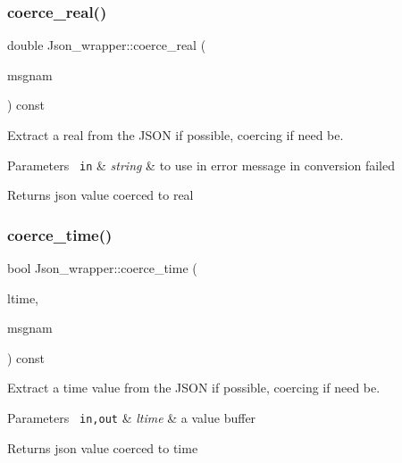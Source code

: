 \subsubsection{\texorpdfstring{coerce\+\_\+real()}{coerce\_real()}}
{\footnotesize\ttfamily double Json\+\_\+wrapper\+::coerce\+\_\+real (\begin{DoxyParamCaption}\item[{const char $\ast$}]{msgnam }\end{DoxyParamCaption}) const}

Extract a real from the J\+S\+ON if possible, coercing if need be.


\begin{DoxyParams}[1]{Parameters}
\mbox{\texttt{ in}}  & {\em string} & to use in error message in conversion failed \\
\hline
\end{DoxyParams}
\begin{DoxyReturn}{Returns}
json value coerced to real 
\end{DoxyReturn}
\mbox{\label{classJson__wrapper_a31da2ba0c06635c562a785596d868ee0}} 
\subsubsection{\texorpdfstring{coerce\+\_\+time()}{coerce\_time()}}
{\footnotesize\ttfamily bool Json\+\_\+wrapper\+::coerce\+\_\+time (\begin{DoxyParamCaption}\item[{M\+Y\+S\+Q\+L\+\_\+\+T\+I\+ME $\ast$}]{ltime,  }\item[{const char $\ast$}]{msgnam }\end{DoxyParamCaption}) const}

Extract a time value from the J\+S\+ON if possible, coercing if need be.


\begin{DoxyParams}[1]{Parameters}
\mbox{\texttt{ in,out}}  & {\em ltime} & a value buffer \\
\hline
\end{DoxyParams}
\begin{DoxyReturn}{Returns}
json value coerced to time 
\end{DoxyReturn}
\mbox{\label{classJson__wrapper_aba6801a36265c71f07e888c5042f63df}} 
